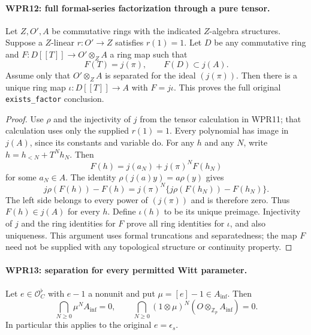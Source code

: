 \documentclass[11pt,a4paper]{article}
\numberwithin{equation}{section}
\theoremstyle{remark}\newtheorem{remark}[theorem]{Remark}
\begin{document}
\paragraph{WPR12: full formal-series factorization through a pure tensor.}
\label{claim:WPR12}
Let $Z,O',A$ be commutative rings with the indicated $Z$-algebra
structures. Suppose a $Z$-linear $r:O'\to Z$ satisfies $r(1)=1$.
Let $D$ be any commutative ring and
$F:D[[T]]\to O'\otimes_Z A$ a ring map such that
\[
 F(T)=j(\pi),\qquad F(D)\subset j(A).
\]
Assume only that $O'\otimes_Z A$ is separated for the ideal
$(j(\pi))$. Then there is a unique ring map
$\iota:D[[T]]\to A$ with $F=j\iota$.
This proves the full original \texttt{exists\_\allowbreak factor} conclusion.

\begin{proof}
Use $\rho$ and the injectivity of $j$ from the tensor calculation
in WPR11; that calculation uses only the supplied $r(1)=1$.
Every polynomial has image in $j(A)$, since its constants and
variable do. For any $h$ and any $N$, write
$h=h_{<N}+T^Nh_N$. Then
\[
 F(h)=j(a_N)+j(\pi)^NF(h_N)
\]
for some $a_N\in A$. The identity
$\rho(j(a)y)=a\rho(y)$ gives
\[
 j\rho(F(h))-F(h)
   =j(\pi)^N\{j\rho(F(h_N))-F(h_N)\}.
\]
The left side belongs to every power of $(j(\pi))$ and is
therefore zero. Thus $F(h)\in j(A)$ for every $h$.
Define $\iota(h)$ to be its unique preimage. Injectivity of $j$
and the ring identities for $F$ prove all ring identities for
$\iota$, and also uniqueness. This argument uses formal
truncations and separatedness; the map $F$ need not be supplied
with any topological structure or continuity property.
\end{proof}

\paragraph{WPR13: separation for every permitted Witt parameter.}
\label{claim:WPR13}
Let $e\in\mathcal O_C^\flat$ with $e-1$ a nonunit and put
$\mu=[e]-1\in A_{\mathrm{inf}}$. Then
\[
 \bigcap_{N\geq0}\mu^NA_{\mathrm{inf}}=0,
 \qquad
 \bigcap_{N\geq0}(1\otimes\mu)^N(O\otimes_{\mathbb Z_p}A_{\mathrm{inf}})=0.
 \tag{WPR.15}
\]
In particular this applies to the original $e=\epsilon_s$.
\end{document}
